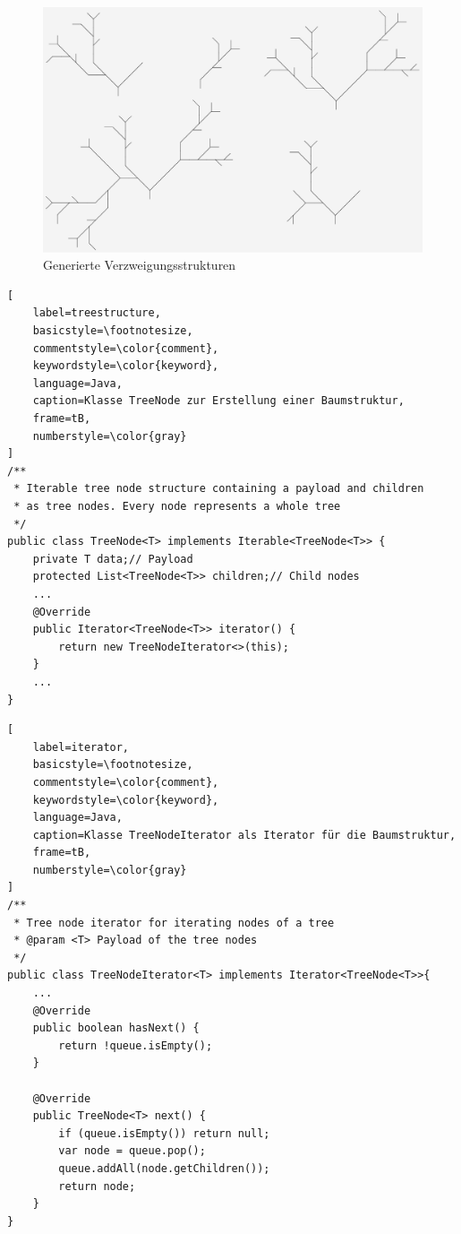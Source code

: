 \begin{figure}[H]
    \includegraphics[width=14.8cm]{../images/example_full.png}
    \caption{Generierte Verzweigungsstrukturen}
    \label{resulting_structures}
\end{figure}

\newpage

\begin{lstlisting}[
    label=treestructure,
    basicstyle=\footnotesize,
    commentstyle=\color{comment},
    keywordstyle=\color{keyword},
    language=Java,
    caption=Klasse TreeNode zur Erstellung einer Baumstruktur,
    frame=tB,
    numberstyle=\color{gray}
]
/**
 * Iterable tree node structure containing a payload and children
 * as tree nodes. Every node represents a whole tree
 */
public class TreeNode<T> implements Iterable<TreeNode<T>> {
    private T data;// Payload
    protected List<TreeNode<T>> children;// Child nodes
    ...
    @Override
    public Iterator<TreeNode<T>> iterator() {
        return new TreeNodeIterator<>(this);
    }
    ...
}
\end{lstlisting}

\begin{lstlisting}[
    label=iterator,
    basicstyle=\footnotesize,
    commentstyle=\color{comment},
    keywordstyle=\color{keyword},
    language=Java,
    caption=Klasse TreeNodeIterator als Iterator für die Baumstruktur,
    frame=tB,
    numberstyle=\color{gray}
]
/**
 * Tree node iterator for iterating nodes of a tree
 * @param <T> Payload of the tree nodes
 */
public class TreeNodeIterator<T> implements Iterator<TreeNode<T>>{
    ...
    @Override
    public boolean hasNext() {
        return !queue.isEmpty();
    }

    @Override
    public TreeNode<T> next() {
        if (queue.isEmpty()) return null;
        var node = queue.pop();
        queue.addAll(node.getChildren());
        return node;
    }
}
\end{lstlisting}


